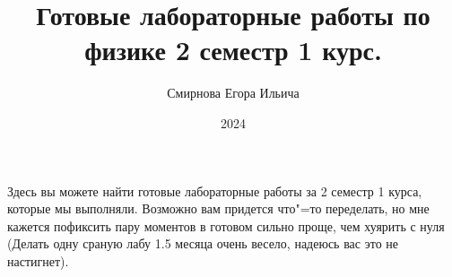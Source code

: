 \documentclass[bachelor, och, referat]{SCWorks}
\begin{document}

\title{Готовые лабораторные работы по физике 2 семестр 1 курс.}






\author{Смирнова Егора Ильича}

\date{2024}

\maketitle


\tableofcontents





\intro

Здесь вы можете найти готовые лабораторные работы за 2 семестр 1 курса, которые мы выполняли. Возможно вам придется что"=то переделать, но мне кажется пофиксить пару моментов в готовом сильно проще, чем хуярить с нуля (Делать одну сраную лабу 1.5 месяца очень весело, надеюсь вас это не настигнет).
\end{document}
